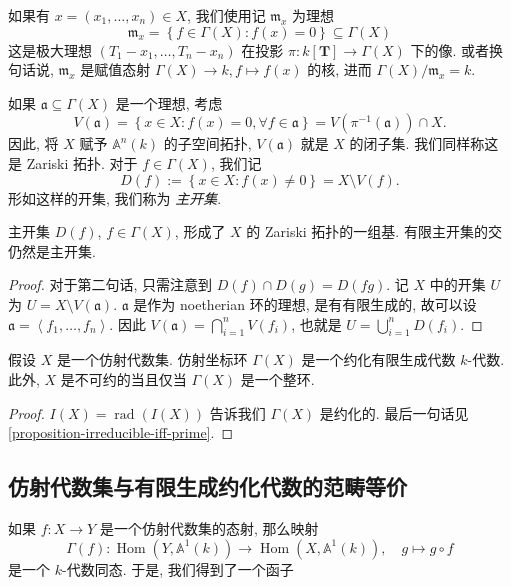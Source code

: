 如果有 \( x = (x_1, \ldots, x_n) \in X \), 我们使用记 \( \mathfrak{m}_x \)
为理想
\[
  \mathfrak{m}_x = \left\lbrace f \in \Gamma(X): f(x) = 0 \right\rbrace
  \subseteq \Gamma(X)
\]
这是极大理想 \( (T_1 - x_1, \ldots, T_n - x_n) \) 在投影 \( \pi: k[\mathbf{T}]
\to \Gamma(X) \) 下的像. 或者换句话说, \( \mathfrak{m}_x \) 是赋值态射 \(
\Gamma(X) \to k, f \mapsto f(x) \) 的核, 进而 \( \Gamma(X) / \mathfrak{m}_x = k
\).

如果 \( \mathfrak{a} \subseteq \Gamma(X) \) 是一个理想, 考虑
\[
  V(\mathfrak{a}) = \left\lbrace x \in X: f(x) = 0, \forall f \in \mathfrak{a}
  \right\rbrace = V(\pi^{-1}(\mathfrak{a}))\cap X.
\]
因此, 将 \( X \) 赋予 \( \mathbb{A}^n(k) \) 的子空间拓扑, \( V(\mathfrak{a}) \)
就是 \( X \) 的闭子集. 我们同样称这是 Zariski 拓扑. 对于 \( f \in \Gamma(X) \),
我们记
\[
  D(f) := \left\lbrace x \in X: f(x) \neq 0 \right\rbrace = X \setminus V(f).
\]
形如这样的开集, 我们称为 \emph{主开集}.

\begin{lemma}
  主开集 \( D(f) \), \( f \in \Gamma(X) \), 形成了 \( X \) 的 Zariski
  拓扑的一组基. 有限主开集的交仍然是主开集.
\end{lemma}
\begin{proof}
  对于第二句话, 只需注意到 \( D(f) \cap D(g) = D(fg) \).
  记 \( X \) 中的开集 \( U \) 为 \( U = X \setminus V(\mathfrak{a}) \).
  \( \mathfrak{a} \) 是作为 noetherian 环的理想, 是有有限生成的, 故可以设 \(
  \mathfrak{a} = \left\langle f_1,\ldots, f_n \right\rangle \). 因此 \(
  V(\mathfrak{a}) = \bigcap_{i = 1}^n V(f_i) \), 也就是 \( U = \bigcup_{i = 1}^n
  D(f_i) \).
\end{proof}

\begin{proposition}
  \label{proposition-irreducible-iff-integral}
  假设 \( X \) 是一个仿射代数集. 仿射坐标环 \( \Gamma(X) \)
  是一个约化有限生成代数 \( k \)-代数. 此外, \( X \) 是不可约的当且仅当 \(
  \Gamma(X) \) 是一个整环.
\end{proposition}
\begin{proof}
  \( I(X) = \operatorname{rad}(I(X)) \) 告诉我们 \( \Gamma(X) \) 是约化的.
  最后一句话见 \cref{proposition-irreducible-iff-prime}.
\end{proof}

\subsection{仿射代数集与有限生成约化代数的范畴等价}

如果 \( f: X \to Y \) 是一个仿射代数集的态射, 那么映射
\[
  \Gamma(f): \operatorname{Hom}(Y, \mathbb{A}^1(k)) \to \operatorname{Hom}(X,
  \mathbb{A}^1 (k)),\quad g \mapsto g \circ f
\]
是一个 \( k \)-代数同态. 于是, 我们得到了一个函子

